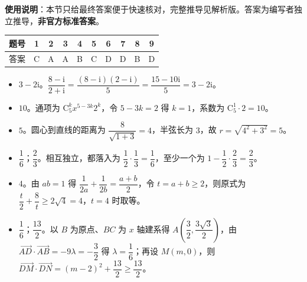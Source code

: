 
\begin{gknotice}
\textbf{使用说明}：本节只给最终答案便于快速核对，完整推导见解析版。答案为编写者独立推导，\textbf{非官方标准答案}。
\end{gknotice}

\begin{center}\begin{tabular}{cccccccccc}
\toprule
题号 & 1 & 2 & 3 & 4 & 5 & 6 & 7 & 8 & 9 \\
\midrule
答案 & C & A & A & B & C & D & D & B & D \\
\bottomrule
\end{tabular}\end{center}

\begin{itemize}[leftmargin=2.6em]
  \item[\textbf{10.}] $3-2\mathrm i$。$\dfrac{8-\mathrm i}{2+\mathrm i}=\dfrac{(8-\mathrm i)(2-\mathrm i)}5=\dfrac{15-10\mathrm i}5=3-2\mathrm i$。
  \item[\textbf{11.}] $10$。通项为 $\mathrm C_5^kx^{5-3k}2^k$，令 $5-3k=2$ 得 $k=1$，系数为 $\mathrm C_5^1\cdot2=10$。
  \item[\textbf{12.}] $5$。圆心到直线的距离为 $\dfrac8{\sqrt{1+3}}=4$，半弦长为 $3$，故 $r=\sqrt{4^2+3^2}=5$。
  \item[\textbf{13.}] $\dfrac16$；$\dfrac23$。相互独立，都落入为 $\dfrac12\cdot\dfrac13=\dfrac16$，至少一个为 $1-\dfrac12\cdot\dfrac23=\dfrac23$。
  \item[\textbf{14.}] $4$。由 $ab=1$ 得 $\dfrac1{2a}+\dfrac1{2b}=\dfrac{a+b}2$，令 $t=a+b\geqslant2$，则原式为 $\dfrac t2+\dfrac8t\geqslant2\sqrt4=4$，$t=4$ 时取等。
  \item[\textbf{15.}] $\dfrac16$；$\dfrac{13}2$。以 $B$ 为原点、$BC$ 为 $x$ 轴建系得 $A\left(\dfrac32,\dfrac{3\sqrt3}2\right)$，由 $\overrightarrow{AD}\cdot\overrightarrow{AB}=-9\lambda=-\dfrac32$ 得 $\lambda=\dfrac16$；再设 $M(m,0)$，则 $\overrightarrow{DM}\cdot\overrightarrow{DN}=(m-2)^2+\dfrac{13}2\geqslant\dfrac{13}2$。
\end{itemize}


